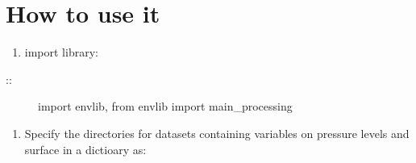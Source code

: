 \documentclass[a4paper,11pt,english]{sphinxmanual}
\begin{document}
\begin{sphinxVerbatim}[commandchars=\\\{\}]
  
\end{sphinxVerbatim}


\chapter{How to use it}
\label{\detokenize{index:how-to-use-it}}\begin{enumerate}
%
\item {} 
import library:

\end{enumerate}
\begin{description}
\item[{::}] \leavevmode
import envlib,
from envlib import main\_processing

\end{description}
\begin{enumerate}
%
\setcounter{enumi}{1}
\item {} 
Specify the directories for datasets containing variables on pressure levels and surface in a dictioary as:

\end{enumerate}
\end{document}
